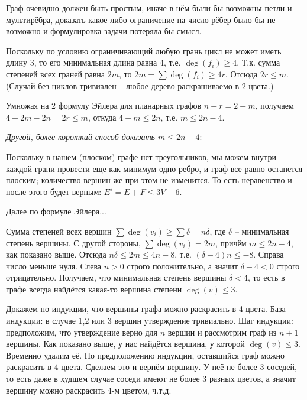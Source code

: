 \documentclass[a4paper,12pt]{article}
\numberwithin{figure}{section}
\begin{document}
\begin{solution}
	Граф очевидно должен быть простым, иначе в нём были бы возможны петли и мультирёбра, доказать какое либо ограничение на число рёбер было бы не возможно и формулировка задачи потеряла бы смысл.

	Поскольку по условию ограничивающий любую грань цикл не может иметь длину 3, то его минимальная длина равна 4, т.е. $\deg(f_i) \geqslant 4$. Т.к. сумма степеней всех граней равна $2m$, то $2m = \sum{\deg(f_i)} \geqslant 4r$. Отсюда $2r \leqslant m$. 
	(Случай без циклов тривиален -- любое дерево раскрашиваемо в 2 цвета.)

	Умножая на 2 формулу Эйлера для планарных графов $n+r=2+m$, получаем $4+2m-2n=2r \leqslant m$, откуда $4+m \leqslant 2n$, т.е. $m \leqslant 2n-4$.

	\begin{elaboration}
		\textit{Другой, более короткий способ доказать $m \leqslant 2n-4$}:
		
		Поскольку в нашем (плоском) графе нет треугольников, мы можем внутри каждой грани провести еще как минимум одно ребро, и граф все равно останется плоским; количество вершин же при этом не изменится. То есть неравенство и после этого будет верным: $E'=E+F\leq3V-6$.
		
		Далее по формуле Эйлера...
	\end{elaboration}

	Сумма степеней всех вершин $\sum \deg(v_i) \geqslant \sum \delta = n\delta$, где $\delta$ -- минимальная степень вершины. С другой стороны, $\sum \deg(v_i) = 2m$, причём $m \leqslant 2n-4$, как показано выше. Отсюда $n\delta \leqslant 2m \leqslant 4n-8$, т.е. $(\delta - 4)n \leqslant -8$. Справа число меньше нуля. Слева $n>0$ строго положительно, а значит $\delta-4<0$ строго отрицательно. Получаем, что минимальная степень вершины $\delta < 4$, то есть в графе всегда найдётся какая-то вершина степени $\deg(v) \leqslant 3$.
	
	Докажем по индукции, что вершины графа можно раскрасить в 4 цвета. База индукции: в случае 1,2 или 3 вершин утверждение тривиально. Шаг индукции: предположим, что утверждение верно для $n$ вершин и рассмотрим граф из $n+1$ вершины. Как показано выше, у нас найдётся вершина, у которой $\deg(v) \leqslant 3$. Временно удалим её. По предположению индукции, оставшийся граф можно раскрасить в 4 цвета. Сделаем это и вернём вершину. У неё не более 3 соседей, то есть даже в худшем случае соседи имеют не более 3 разных цветов, а значит вершину можно раскрасить 4-м цветом, ч.т.д.
\end{solution}
\end{document}
